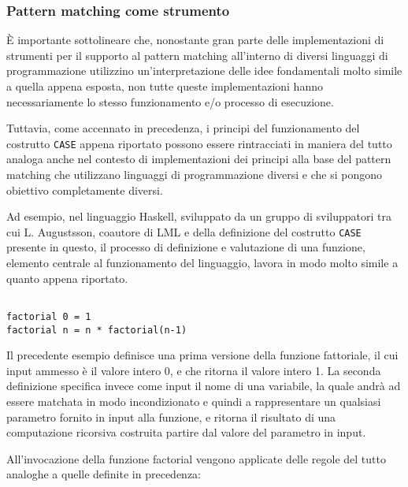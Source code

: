 \subsubsection{Pattern matching come strumento}

È importante sottolineare che, nonostante gran parte delle implementazioni di
strumenti per il supporto al pattern matching all’interno di diversi linguaggi
di programmazione utilizzino un’interpretazione delle idee fondamentali molto
simile a quella appena esposta, non tutte queste implementazioni hanno
necessariamente lo stesso funzionamento e/o processo di esecuzione.

Tuttavia, come accennato in precedenza, i principi del funzionamento del
costrutto \texttt{CASE} appena riportato possono essere rintracciati in maniera
del tutto analoga anche nel contesto di implementazioni dei principi alla base
del pattern matching che utilizzano linguaggi di programmazione diversi e che si
pongono obiettivo completamente diversi.

Ad esempio, nel linguaggio Haskell, sviluppato da un gruppo di sviluppatori tra
cui L. Augustsson, coautore di LML e della definizione del costrutto
\texttt{CASE} presente in questo, il processo di definizione e valutazione di
una funzione, elemento centrale al funzionamento del linguaggio, lavora in modo
molto simile a quanto appena riportato.

\begin{lstlisting}[caption=Esempio di definizione di una funzione Haskell naive
per il calcolo del fattoriale]

factorial 0 = 1
factorial n = n * factorial(n-1)

\end{lstlisting}

Il precedente esempio definisce una prima versione della funzione fattoriale, il
cui input ammesso è il valore intero 0, e che ritorna il valore intero 1. La
seconda definizione specifica invece come input il nome di una variabile, la
quale andrà ad essere matchata in modo incondizionato e quindi a rappresentare
un qualsiasi parametro fornito in input alla funzione, e ritorna il risultato di
una computazione ricorsiva costruita partire dal valore del parametro in input.

All’invocazione della funzione factorial vengono applicate delle regole del
tutto analoghe a quelle definite in precedenza:

